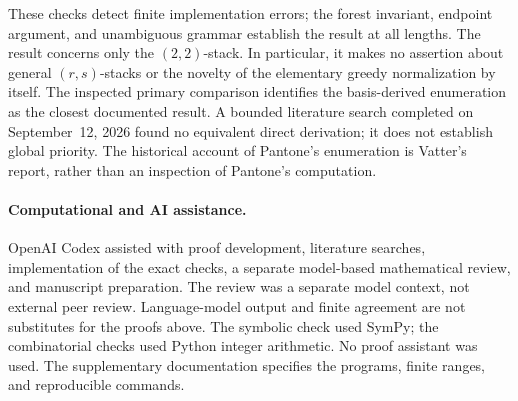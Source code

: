 \documentclass[11pt,a4paper]{article}
\theoremstyle{remark}
\begin{document}
These checks detect finite implementation errors; the forest invariant,
endpoint argument, and unambiguous grammar establish the result at all
lengths. The result concerns only the $(2,2)$-stack. In particular, it
makes no assertion about general $(r,s)$-stacks or the novelty of the
elementary greedy normalization by itself. The inspected primary
comparison identifies the basis-derived enumeration as the closest
documented result. A bounded literature search completed on September~12,
2026 found no equivalent direct derivation; it does not establish global
priority. The historical account of Pantone's enumeration is Vatter's
report, rather than an inspection of Pantone's computation.

\paragraph{Computational and AI assistance.}
OpenAI Codex assisted with proof development, literature searches,
implementation of the exact checks, a separate model-based mathematical
review, and manuscript preparation. The review was a separate model
context, not external peer review. Language-model output and finite
agreement are not substitutes for the proofs above. The symbolic check
used SymPy; the combinatorial checks used Python integer arithmetic.
No proof assistant was used. The supplementary documentation specifies
the programs, finite ranges, and reproducible commands.



\end{document}
